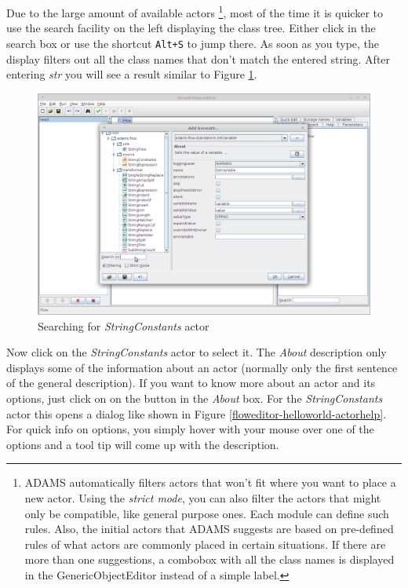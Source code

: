 Due to the large amount of available actors \footnote{ADAMS automatically
filters actors that won't fit where you want to place a new actor. Using the
\textit{strict mode}, you can also filter the actors that might only be
compatible, like general purpose ones. Each module can define such rules. Also,
the initial actors that ADAMS suggests are based on pre-defined rules of what
actors are commonly placed in certain situations. If there are more than one
suggestions, a combobox with all the class names is displayed in the
GenericObjectEditor instead of a simple label.}, most of the time it is quicker
to use the search facility on the left displaying the class tree. Either click
in the search box or use the shortcut \texttt{Alt+S} to jump there. As soon as
you type, the display filters out all the class names that don't match the
entered string. After entering \textit{str} you will see a result similar to
Figure \ref{floweditor-helloworld-addactor3}.

\begin{figure}[htb]
  \centering
  \includegraphics[width=12.0cm]{images/floweditor-helloworld-addactor3.png}
  \caption{Searching for \textit{StringConstants} actor}
  \label{floweditor-helloworld-addactor3}
\end{figure}

Now click on the \textit{StringConstants} actor to select it. The \textit{About}
description only displays some of the information about an actor (normally only
the first sentence of the general description). If you want to know more about
an actor and its options, just click on on the  button in the
\textit{About} box. For the \textit{StringConstants} actor this opens a dialog
like shown in Figure \ref{floweditor-helloworld-actorhelp}. For quick info on
options, you simply hover with your mouse over one of the options and a tool tip
will come up with the description.

